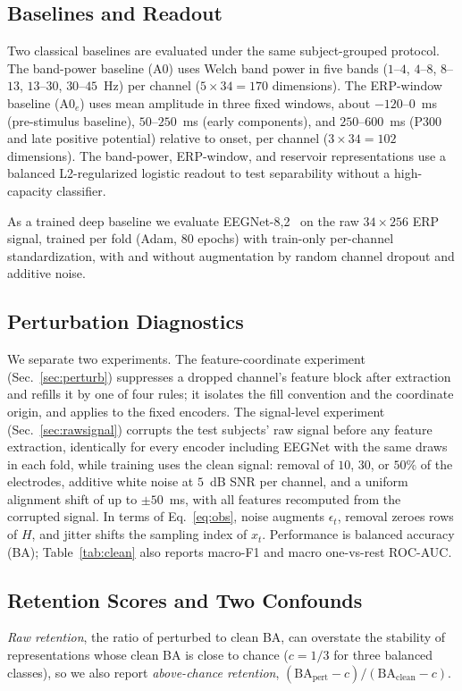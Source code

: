 \documentclass[conference]{IEEEtran}
\begin{document}
\subsection{Baselines and Readout}
Two classical baselines are evaluated under the same subject-grouped protocol. The band-power baseline (A0) uses Welch band power in five bands ($1$--$4$, $4$--$8$, $8$--$13$, $13$--$30$, $30$--$45$~Hz) per channel ($5\times34=170$ dimensions). The ERP-window baseline (A0$_e$) uses mean amplitude in three fixed windows, about $-120$--$0$~ms (pre-stimulus baseline), $50$--$250$~ms (early components), and $250$--$600$~ms (P300 and late positive potential) relative to onset, per channel ($3 \times 34 = 102$ dimensions). The band-power, ERP-window, and reservoir representations use a balanced L2-regularized logistic readout to test separability without a high-capacity classifier.

As a trained deep baseline we evaluate EEGNet-8,2~\cite{lawhern2018eegnet} on the raw $34\times256$ ERP signal, trained per fold (Adam, $80$ epochs) with train-only per-channel standardization, with and without augmentation by random channel dropout and additive noise.

\subsection{Perturbation Diagnostics}
We separate two experiments. The feature-coordinate experiment (Sec.~\ref{sec:perturb}) suppresses a dropped channel's feature block after extraction and refills it by one of four rules; it isolates the fill convention and the coordinate origin, and applies to the fixed encoders. The signal-level experiment (Sec.~\ref{sec:rawsignal}) corrupts the test subjects' raw signal before any feature extraction, identically for every encoder including EEGNet with the same draws in each fold, while training uses the clean signal: removal of $10$, $30$, or $50\%$ of the electrodes, additive white noise at $5$~dB SNR per channel, and a uniform alignment shift of up to $\pm 50$~ms, with all features recomputed from the corrupted signal. In terms of Eq.~\eqref{eq:obs}, noise augments $\epsilon_t$, removal zeroes rows of $H$, and jitter shifts the sampling index of $x_t$. Performance is balanced accuracy (BA); Table~\ref{tab:clean} also reports macro-F1 and macro one-vs-rest ROC-AUC.

\subsection{Retention Scores and Two Confounds}
\label{sec:confound}
\emph{Raw retention}, the ratio of perturbed to clean BA, can overstate the stability of representations whose clean BA is close to chance ($c=1/3$ for three balanced classes), so we also report \emph{above-chance retention}, $(\mathrm{BA}_{\mathrm{pert}}-c)/(\mathrm{BA}_{\mathrm{clean}}-c)$.
\end{document}
